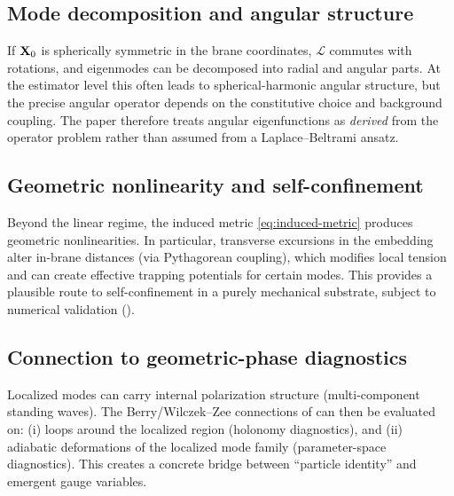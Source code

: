 \subsection{Mode decomposition and angular structure}

If $\mathbf{X}_0$ is spherically symmetric in the brane coordinates, $\mathcal{L}$ commutes with rotations,
and eigenmodes can be decomposed into radial and angular parts.
At the estimator level this often leads to spherical-harmonic angular structure,
but the precise angular operator depends on the constitutive choice and background coupling.
The paper therefore treats angular eigenfunctions as \emph{derived} from the operator problem
rather than assumed from a Laplace--Beltrami ansatz.

\subsection{Geometric nonlinearity and self-confinement}

Beyond the linear regime, the induced metric \eqref{eq:induced-metric} produces geometric nonlinearities.
In particular, transverse excursions in the embedding alter in-brane distances (via Pythagorean coupling),
which modifies local tension and can create effective trapping potentials for certain modes.
This provides a plausible route to self-confinement in a purely mechanical substrate,
subject to numerical validation ().

\subsection{Connection to geometric-phase diagnostics}

Localized modes can carry internal polarization structure (multi-component standing waves).
The Berry/Wilczek--Zee connections of  can then be evaluated on:
(i) loops around the localized region (holonomy diagnostics), and
(ii) adiabatic deformations of the localized mode family (parameter-space diagnostics).
This creates a concrete bridge between ``particle identity'' and emergent gauge variables.
